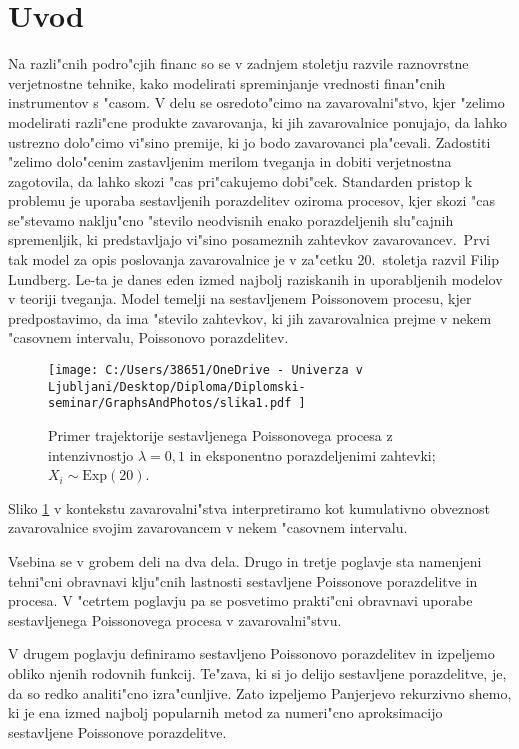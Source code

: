 \documentclass[12pt, a4paper, reqno]{amsart}
\theoremstyle{definition}
\theoremstyle{plain}
\newcommand{\1}{\mathds{1}}
\begin{document}
\section{Uvod}
    Na razli"cnih podro"cjih financ so se v zadnjem stoletju razvile raznovrstne verjetnostne tehnike, kako 
    modelirati spreminjanje vrednosti finan"cnih instrumentov s "casom. V delu se osredoto"cimo na zavarovalni"stvo, 
    kjer "zelimo modelirati razli"cne produkte zavarovanja, ki jih zavarovalnice ponujajo, da lahko ustrezno dolo"cimo vi"sino premije, ki jo
    bodo zavarovanci pla"cevali. Zadostiti "zelimo dolo"cenim zastavljenim merilom tveganja in dobiti verjetnostna zagotovila, 
    da lahko skozi "cas pri"cakujemo dobi"cek. 
    Standarden pristop k problemu je uporaba sestavljenih porazdelitev oziroma procesov, kjer skozi "cas se"stevamo naklju"cno "stevilo 
    neodvisnih enako porazdeljenih slu"cajnih spremenljik, ki predstavljajo vi"sino posameznih zahtevkov zavarovancev.\ Prvi tak model za opis
    poslovanja zavarovalnice 
    je v za"cetku 20.\ stoletja razvil Filip Lundberg. Le-ta je danes eden izmed najbolj raziskanih in 
    uporabljenih modelov v teoriji tveganja. Model temelji na sestavljenem Poissonovem procesu, kjer predpostavimo, da ima "stevilo zahtevkov,
    ki jih zavarovalnica prejme v nekem "casovnem intervalu, Poissonovo porazdelitev.

    \begin{figure}[H]
        \centering
        \texttt{[image: 
            C:/Users/38651/OneDrive - Univerza v Ljubljani/Desktop/Diploma/Diplomski-seminar/GraphsAndPhotos/slika1.pdf
            ]}
        \caption{Primer trajektorije sestavljenega Poissonovega procesa z intenzivnostjo $\lambda = 0{,}1$ in
        eksponentno porazdeljenimi zahtevki; $X_i\sim\text{Exp}(20)$.}
        \label{fig:slika1}
    \end{figure}
    \noindent
    Sliko \ref{fig:slika1} v kontekstu zavarovalni"stva interpretiramo kot kumulativno obveznost zavarovalnice 
    svojim zavarovancem v nekem "casovnem intervalu. 

    Vsebina se v grobem deli na dva dela. Drugo in tretje poglavje sta namenjeni tehni"cni obravnavi klju"cnih lastnosti 
    sestavljene Poissonove porazdelitve in procesa. V "cetrtem poglavju pa se posvetimo prakti"cni obravnavi uporabe sestavljenega
    Poissonovega procesa v zavarovalni"stvu. 

    V drugem poglavju definiramo sestavljeno Poissonovo porazdelitev in izpeljemo obliko njenih rodovnih funkcij.
    Te"zava, ki si jo delijo sestavljene porazdelitve, je, da so redko analiti"cno izra"cunljive. 
    Zato izpeljemo Panjerjevo rekurzivno shemo, ki 
    je ena izmed najbolj popularnih metod za numeri"cno aproksimacijo sestavljene Poissonove porazdelitve.
\end{document}
